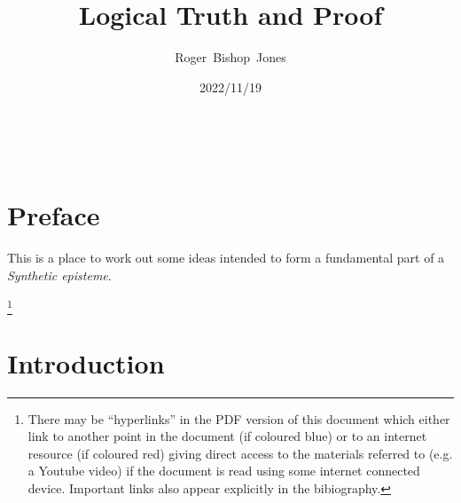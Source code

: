 \documentclass[10pt,titlepage]{article}
\title{\LARGE\bf Logical Truth and Proof}
\author{Roger~Bishop~Jones}
\date{\small 2022/11/19}
\newcommand{\ignore}[1]{}
\begin{document}
                               
\begin{titlepage}
\maketitle





\end{titlepage}

\ \

\ignore{
\begin{centering}
{}
\end{centering}
}%

\setcounter{tocdepth}{2}
{\parskip-0pt\tableofcontents}


\pagebreak

\section*{Preface}

This is a place to work out some ideas intended to form a fundamental part of a \emph{Synthetic episteme}.

\footnote{There may be ``hyperlinks'' in the PDF version of this document which either link to another point in the document  (if coloured blue) or to an internet resource  (if coloured red) giving direct access to the materials referred to (e.g. a Youtube video) if the document is read using some internet connected device.
Important links also appear explicitly in the bibiography.}

\section{Introduction}
\end{document}
